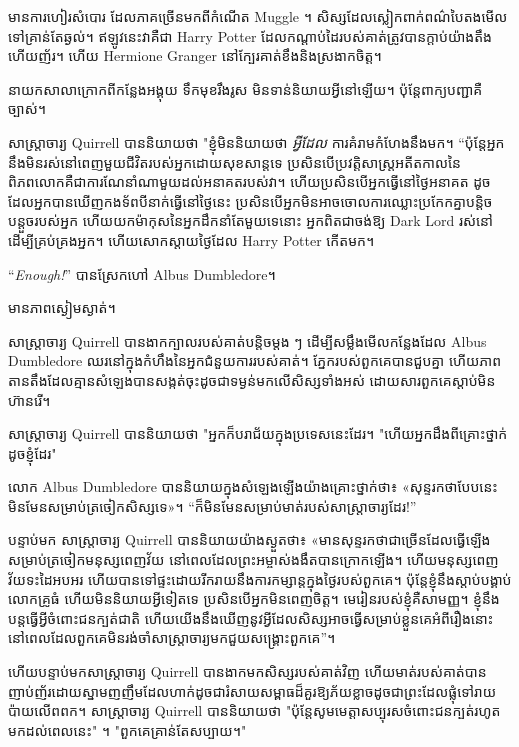 {មានការហៀរសំបោរ ដែលភាគច្រើនមកពីកំណើត Muggle ។ សិស្ស​ដែល​ស្លៀក​ពាក់​ពណ៌​បៃតង​មើល​ទៅ​គ្រាន់​តែ​ឆ្ងល់។ ឥឡូវនេះវាគឺជា Harry Potter ដែលកណ្តាប់ដៃរបស់គាត់ត្រូវបានក្តាប់យ៉ាងតឹង ហើយញ័រ។ ហើយ Hermione Granger នៅក្បែរគាត់ខឹងនិងស្រងាកចិត្ត។

នាយកសាលាក្រោកពីកន្លែងអង្គុយ ទឹកមុខរឹងរូស មិនទាន់និយាយអ្វីនៅឡើយ។ ប៉ុន្តែពាក្យបញ្ជាគឺច្បាស់។

សាស្ត្រាចារ្យ Quirrell បាននិយាយថា "ខ្ញុំមិននិយាយថា \emph{អ្វីដែល} ការគំរាមកំហែងនឹងមក។ “ប៉ុន្តែអ្នកនឹងមិនរស់នៅពេញមួយជីវិតរបស់អ្នកដោយសុខសាន្តទេ ប្រសិនបើប្រវត្តិសាស្រ្តអតីតកាលនៃពិភពលោកគឺជាការណែនាំណាមួយដល់អនាគតរបស់វា។ ហើយប្រសិនបើអ្នកធ្វើនៅថ្ងៃអនាគត ដូចដែលអ្នកបានឃើញកងទ័ពបីនាក់ធ្វើនៅថ្ងៃនេះ ប្រសិនបើអ្នកមិនអាចចោលការឈ្លោះប្រកែកគ្នាបន្តិចបន្តួចរបស់អ្នក ហើយយកម៉ាកុសនៃអ្នកដឹកនាំតែមួយទេនោះ អ្នកពិតជាចង់ឱ្យ Dark Lord រស់នៅដើម្បីគ្រប់គ្រងអ្នក។ ហើយសោកស្តាយថ្ងៃដែល Harry Potter កើតមក។

“\emph{Enough!}” បានស្រែកហៅ Albus Dumbledore។

មានភាពស្ងៀមស្ងាត់។

សាស្រ្តាចារ្យ Quirrell បានងាកក្បាលរបស់គាត់បន្តិចម្តង ៗ ដើម្បីសម្លឹងមើលកន្លែងដែល Albus Dumbledore ឈរនៅក្នុងកំហឹងនៃអ្នកជំនួយការរបស់គាត់។ ភ្នែក​របស់​ពួកគេ​បាន​ជួប​គ្នា ហើយ​ភាព​តានតឹង​ដែល​គ្មាន​សំឡេង​បាន​សង្កត់​ចុះ​ដូច​ជា​ទម្ងន់​មក​លើ​សិស្ស​ទាំង​អស់ ដោយ​សារ​ពួកគេ​ស្តាប់​មិន​ហ៊ាន​រើ។

សាស្ត្រាចារ្យ Quirrell បាននិយាយថា "អ្នកក៏បរាជ័យក្នុងប្រទេសនេះដែរ។ "ហើយអ្នកដឹងពីគ្រោះថ្នាក់ដូចខ្ញុំដែរ"

លោក Albus Dumbledore បាន​និយាយ​ក្នុង​សំឡេង​ឡើង​យ៉ាង​គ្រោះថ្នាក់​ថា​៖ «​សុន្ទរកថា​បែបនេះ​មិនមែន​សម្រាប់​ត្រចៀក​សិស្ស​ទេ​»​។ “ក៏មិនមែនសម្រាប់មាត់របស់សាស្រ្តាចារ្យដែរ!”

បន្ទាប់មក សាស្ត្រាចារ្យ Quirrell បាននិយាយយ៉ាងស្ងួតថា៖ «មានសុន្ទរកថាជាច្រើនដែលធ្វើឡើងសម្រាប់ត្រចៀកមនុស្សពេញវ័យ នៅពេលដែលព្រះអម្ចាស់ងងឹតបានក្រោកឡើង។ ហើយ​មនុស្ស​ពេញ​វ័យ​ទះ​ដៃ​អបអរ ហើយ​បាន​ទៅ​ផ្ទះ​ដោយ​រីករាយ​នឹង​ការ​កម្សាន្ត​ក្នុង​ថ្ងៃ​របស់​ពួក​គេ។ ប៉ុន្តែ​ខ្ញុំ​នឹង​ស្តាប់​បង្គាប់​លោក​គ្រូ​ធំ ហើយ​មិន​និយាយ​អ្វី​ទៀត​ទេ ប្រសិន​បើ​អ្នក​មិន​ពេញ​ចិត្ត។ មេរៀនរបស់ខ្ញុំគឺសាមញ្ញ។ ខ្ញុំនឹងបន្តធ្វើអ្វីចំពោះជនក្បត់ជាតិ ហើយយើងនឹងឃើញនូវអ្វីដែលសិស្សអាចធ្វើសម្រាប់ខ្លួនគេអំពីរឿងនោះ នៅពេលដែលពួកគេមិនរង់ចាំសាស្រ្តាចារ្យមកជួយសង្គ្រោះពួកគេ”។

ហើយបន្ទាប់មកសាស្រ្តាចារ្យ Quirrell បានងាកមកសិស្សរបស់គាត់វិញ ហើយមាត់របស់គាត់បានញាប់ញ័រដោយស្នាមញញឹមដែលហាក់ដូចជារំសាយសម្ពាធដ៏គួរឱ្យភ័យខ្លាចដូចជាព្រះដែលផ្លុំទៅរាយប៉ាយលើពពក។ សាស្រ្តាចារ្យ Quirrell បាននិយាយថា "ប៉ុន្តែសូមមេត្តាសប្បុរសចំពោះជនក្បត់រហូតមកដល់ពេលនេះ" ។ "ពួកគេគ្រាន់តែសប្បាយ។"

}
